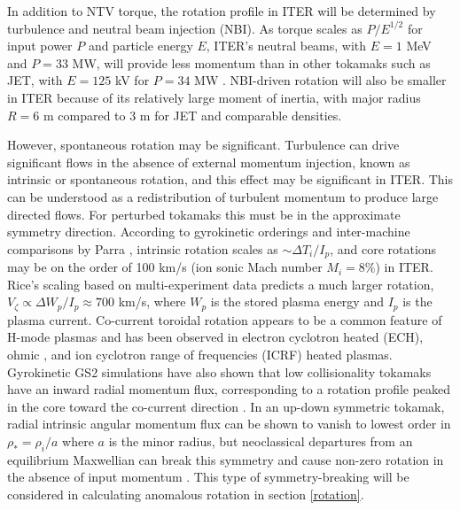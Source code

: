 \documentclass{article}
\numberwithin{figure}{section}
\numberwithin{equation}{section}
\begin{document}
In addition to NTV torque, the rotation profile in ITER will be determined by turbulence and neutral beam injection (NBI). 
As torque scales as $P/E^{1/2}$ for input power $P$ and particle energy $E$, ITER's neutral beams, with $E = 1$ MeV and $P = 33$ MW, will provide less momentum than in other tokamaks such as JET, with $E = 125$ kV for $P = 34$ MW \cite{Ciric2011}. NBI-driven rotation will also be smaller in ITER because of its relatively large moment of inertia, with major radius $R = 6$ m compared to 3 m for JET and comparable densities. 

However, spontaneous rotation may be significant. Turbulence can drive significant flows in the absence of external momentum injection, known as intrinsic or spontaneous rotation, and this effect may be significant in ITER. This can be understood as a redistribution of turbulent momentum to produce large directed flows. For perturbed tokamaks this must be in the approximate symmetry direction. According to gyrokinetic orderings and inter-machine comparisons by Parra \cite{Parra2012}, intrinsic rotation scales as $\sim \Delta T_i/I_p$, and core rotations may be on the order of 100 km/s (ion sonic Mach number $M_i = 8\%$) in ITER. Rice's scaling based on multi-experiment data \cite{Rice2007} predicts a much larger rotation, $V_{\zeta} \propto \Delta W_p/I_p \approx 700$ km/s, where $W_p$ is the stored plasma energy and $I_p$ is the plasma current. Co-current toroidal rotation appears to be a common feature of H-mode plasmas and has been observed in electron cyclotron heated (ECH)\cite{DeGrassie2007}, ohmic \cite{DeGrassie2007}, and ion cyclotron range of frequencies (ICRF) \cite{Noterdaeme2003} heated plasmas. Gyrokinetic GS2 simulations have also shown that low collisionality tokamaks have an inward radial momentum flux, corresponding to a rotation profile peaked in the core toward the co-current direction \cite{Barnes2013}. In an up-down symmetric tokamak, radial intrinsic angular momentum flux can be shown to vanish to lowest order in $\rho_* = \rho_i/a$ where $a$ is the minor radius, but neoclassical departures from an equilibrium Maxwellian can break this symmetry and cause non-zero rotation in the absence of input momentum \cite{Barnes2013}. This type of symmetry-breaking will be considered in calculating anomalous rotation in section \ref{rotation}. 
\end{document}
